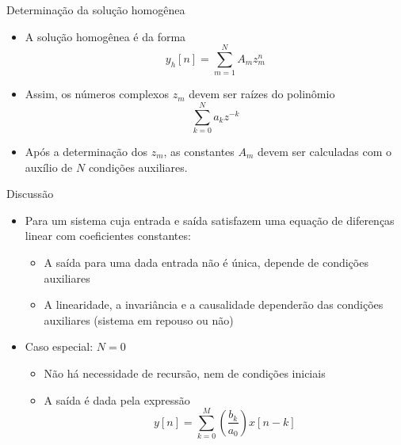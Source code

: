 \documentclass[
size=17pt,
paper=smartboard,
mode=present,
display=slidesnotes,
style=sailor,
nopagebreaks,
blackslide,
fleqn]{powerdot}
\begin{document}
\begin{slide}[toc=]{Determinação da solução homogênea}
   \begin{itemize}
      \item A solução homogênea é da forma
      \begin{equation*}
         y_h[n]=\sum_{m=1}^N A_m z_m^n
      \end{equation*}
      \item Assim, os números complexos $z_m$ devem ser raízes do polinômio
      \begin{equation*}
         \sum_{k=0}^N a_k z^{-k}
      \end{equation*}
      \item Após a determinação dos $z_m$, as constantes $A_m$ devem ser calculadas com o auxílio 
      de $N$ condições auxiliares.
   \end{itemize}
\end{slide}

\begin{slide}[toc=]{Discussão}
   \begin{itemize}
      \item Para um sistema cuja entrada e saída satisfazem uma equação de 
      diferenças linear com coeficientes constantes:
      \begin{itemize}
         \item A saída para uma dada entrada não é única, depende de condições auxiliares
         \item A linearidade, a invariância e a causalidade dependerão das condições auxiliares 
         (sistema em repouso ou não)
      \end{itemize}
      \item Caso especial: $N=0$
      \begin{itemize}
         \item Não há necessidade de recursão, nem de condições iniciais
         \item A saída é dada pela expressão
         \begin{equation*}
            y[n]=\sum_{k=0}^M\left (\frac{b_k}{a_0}\right )x[n-k]
         \end{equation*}
      \end{itemize}
   \end{itemize}
\end{slide}
\end{document}

